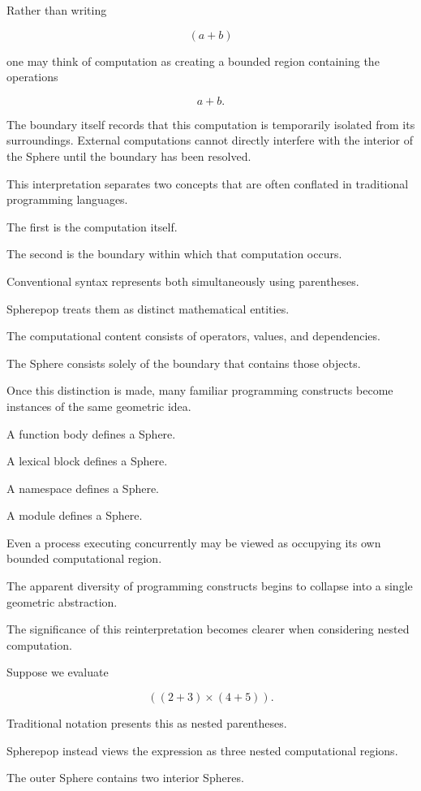 \documentclass[12pt,oneside]{article}
\theoremstyle{definition}
\theoremstyle{remark}
\begin{document}
Rather than writing

\[
(a+b)
\]

one may think of computation as creating a bounded region containing the
operations

\[
a+b.
\]

The boundary itself records that this computation is temporarily isolated from
its surroundings. External computations cannot directly interfere with the
interior of the Sphere until the boundary has been resolved.

This interpretation separates two concepts that are often conflated in
traditional programming languages.

The first is the computation itself.

The second is the boundary within which that computation occurs.

Conventional syntax represents both simultaneously using parentheses.

Spherepop treats them as distinct mathematical entities.

The computational content consists of operators, values, and dependencies.

The Sphere consists solely of the boundary that contains those objects.

Once this distinction is made, many familiar programming constructs become
instances of the same geometric idea.

A function body defines a Sphere.

A lexical block defines a Sphere.

A namespace defines a Sphere.

A module defines a Sphere.

Even a process executing concurrently may be viewed as occupying its own
bounded computational region.

The apparent diversity of programming constructs begins to collapse into a
single geometric abstraction.

The significance of this reinterpretation becomes clearer when considering
nested computation.

Suppose we evaluate

\[
((2+3)\times(4+5)).
\]

Traditional notation presents this as nested parentheses.

Spherepop instead views the expression as three nested computational regions.

The outer Sphere contains two interior Spheres.
\end{document}
